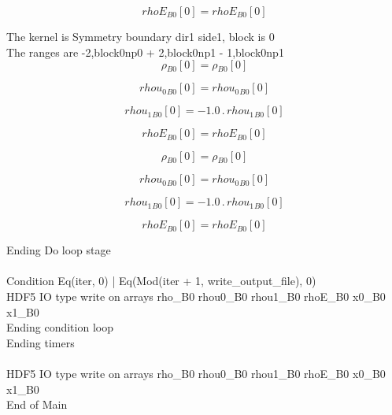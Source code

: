 \documentclass{article}
\begin{document}
\begin{dmath}{rhoE{_{B0}}}[{0}] = {rhoE{_{B0}}}[{0}]\end{dmath}

\noindent The kernel is Symmetry boundary dir1 side1, block is 0\\\noindent The ranges are -2,block0np0 + 2,block0np1 - 1,block0np1\\\begin{dmath}{\rho{_{B0}}}[{0}] = {\rho{_{B0}}}[{0}]\end{dmath}

\begin{dmath}{rhou_{0}{_{B0}}}[{0}] = {rhou_{0}{_{B0}}}[{0}]\end{dmath}

\begin{dmath}{rhou_{1}{_{B0}}}[{0}] = - 1.0 \,.\, {rhou_{1}{_{B0}}}[{0}]\end{dmath}

\begin{dmath}{rhoE{_{B0}}}[{0}] = {rhoE{_{B0}}}[{0}]\end{dmath}

\begin{dmath}{\rho{_{B0}}}[{0}] = {\rho{_{B0}}}[{0}]\end{dmath}

\begin{dmath}{rhou_{0}{_{B0}}}[{0}] = {rhou_{0}{_{B0}}}[{0}]\end{dmath}

\begin{dmath}{rhou_{1}{_{B0}}}[{0}] = - 1.0 \,.\, {rhou_{1}{_{B0}}}[{0}]\end{dmath}

\begin{dmath}{rhoE{_{B0}}}[{0}] = {rhoE{_{B0}}}[{0}]\end{dmath}

\noindent Ending Do loop stage\\
\\\noindent Condition Eq(iter, 0) | Eq(Mod(iter + 1, write_output_file), 0)\\\noindent HDF5 IO type write on arrays rho_B0 rhou0_B0 rhou1_B0 rhoE_B0 x0_B0 x1_B0\\\noindent Ending condition loop %
\\\noindent Ending timers\\
\\\noindent HDF5 IO type write on arrays rho_B0 rhou0_B0 rhou1_B0 rhoE_B0 x0_B0 x1_B0\\\noindent End of Main\\
\end{document}
